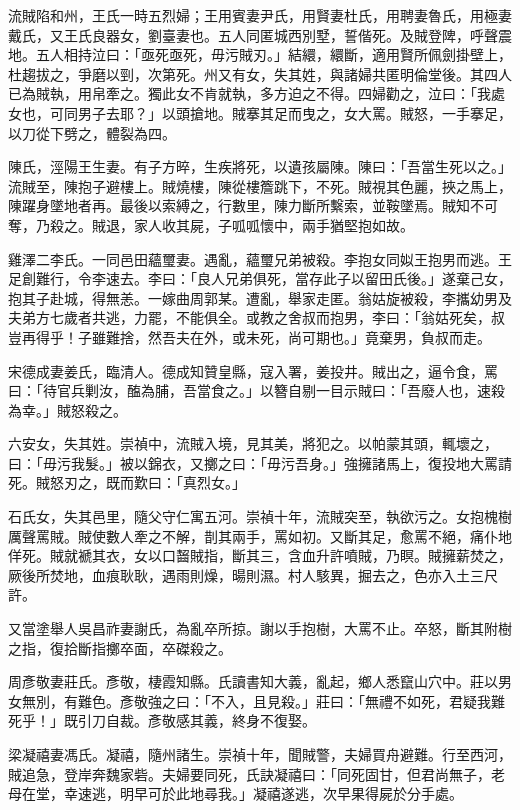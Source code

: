 \begin{pinyinscope}
流賊陷和州，王氏一時五烈婦；王用賓妻尹氏，用賢妻杜氏，用聘妻魯氏，用極妻戴氏，又王氏良器女，劉臺妻也。五人同匿城西別墅，誓偕死。及賊登陴，呼聲震地。五人相持泣曰：「亟死亟死，毋污賊刃。」結繯，繯斷，適用賢所佩劍掛壁上，杜趨拔之，爭磨以剄，次第死。州又有女，失其姓，與諸婦共匿明倫堂後。其四人已為賊執，用帛牽之。獨此女不肯就執，多方迫之不得。四婦勸之，泣曰：「我處女也，可同男子去耶？」以頭搶地。賊搴其足而曳之，女大罵。賊怒，一手搴足，以刀從下劈之，體裂為四。

陳氏，涇陽王生妻。有子方晬，生疾將死，以遺孩屬陳。陳曰：「吾當生死以之。」流賊至，陳抱子避樓上。賊燒樓，陳從樓簷跳下，不死。賊視其色麗，挾之馬上，陳躍身墜地者再。最後以索縛之，行數里，陳力斷所繫索，並鞍墜焉。賊知不可奪，乃殺之。賊退，家人收其屍，子呱呱懷中，兩手猶堅抱如故。

雞澤二李氏。一同邑田蘊璽妻。遇亂，蘊璽兄弟被殺。李抱女同姒王抱男而逃。王足創難行，令李速去。李曰：「良人兄弟俱死，當存此子以留田氏後。」遂棄己女，抱其子赴城，得無恙。一嫁曲周郭某。遭亂，舉家走匿。翁姑旋被殺，李攜幼男及夫弟方七歲者共逃，力罷，不能俱全。或教之舍叔而抱男，李曰：「翁姑死矣，叔豈再得乎！子雖難捨，然吾夫在外，或未死，尚可期也。」竟棄男，負叔而走。

宋德成妻姜氏，臨清人。德成知贊皇縣，寇入署，姜投井。賊出之，逼令食，罵曰：「待官兵剿汝，醢為脯，吾當食之。」以簪自剔一目示賊曰：「吾廢人也，速殺為幸。」賊怒殺之。

六安女，失其姓。崇禎中，流賊入境，見其美，將犯之。以帕蒙其頭，輒壞之，曰：「毋污我髮。」被以錦衣，又擲之曰：「毋污吾身。」強擁諸馬上，復投地大罵請死。賊怒刃之，既而歎曰：「真烈女。」

石氏女，失其邑里，隨父守仁寓五河。崇禎十年，流賊突至，執欲污之。女抱槐樹厲聲罵賊。賊使數人牽之不解，剒其兩手，罵如初。又斷其足，愈罵不絕，痛仆地佯死。賊就褫其衣，女以口齧賊指，斷其三，含血升許噴賊，乃瞑。賊擁薪焚之，厥後所焚地，血痕耿耿，遇雨則燥，暘則濕。村人駭異，掘去之，色亦入土三尺許。

又當塗舉人吳昌祚妻謝氏，為亂卒所掠。謝以手抱樹，大罵不止。卒怒，斷其附樹之指，復拾斷指擲卒面，卒磔殺之。

周彥敬妻莊氏。彥敬，棲霞知縣。氏讀書知大義，亂起，鄉人悉竄山穴中。莊以男女無別，有難色。彥敬強之曰：「不入，且見殺。」莊曰：「無禮不如死，君疑我難死乎！」既引刀自裁。彥敬感其義，終身不復娶。

梁凝禧妻馮氏。凝禧，隨州諸生。崇禎十年，聞賊警，夫婦買舟避難。行至西河，賊追急，登岸奔魏家砦。夫婦要同死，氏訣凝禧曰：「同死固甘，但君尚無子，老母在堂，幸速逃，明早可於此地尋我。」凝禧遂逃，次早果得屍於分手處。


\end{pinyinscope}
